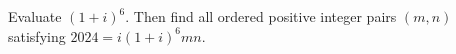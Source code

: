 Evaluate $(1+i)^6$. Then find all ordered positive integer pairs $(m,n)$ satisfying $2024=i(1+i)^6mn$.
